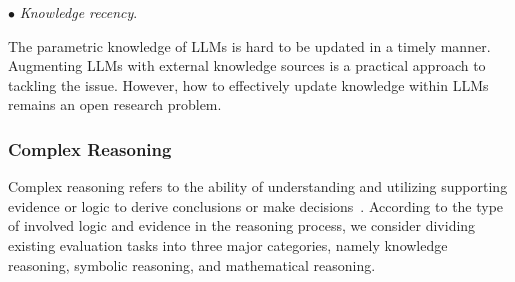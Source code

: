 {{{{{\begin{center}
\begin{tcolorbox}[colback=blue!5!white,colframe=blue!55!black,width=0.46\textwidth,title={Hallucination}]
\end{tcolorbox}
\end{center}

$\bullet$ \emph{Knowledge recency}. 

}

\begin{center}
\begin{tcolorbox}[colback=blue!5!white,colframe=blue!55!black,width=0.46\textwidth,title={Knowledge Recency}]

The parametric knowledge of LLMs is hard to be updated in a timely manner. Augmenting LLMs with external knowledge sources is a practical approach to tackling the issue. However, how to effectively update knowledge within LLMs remains an open research problem.

\end{tcolorbox}
\end{center}

\subsubsection{Complex Reasoning} 

Complex reasoning refers to the ability of understanding and utilizing supporting evidence or logic to derive conclusions or make decisions~\cite{Huang-arxiv-2022-Towards,Qiao-arxiv-2022-Reasoning}. According to the type of involved  logic and evidence in the reasoning process, we consider dividing existing evaluation tasks into three major categories, namely knowledge reasoning, symbolic reasoning, and mathematical reasoning. 

}}}}

